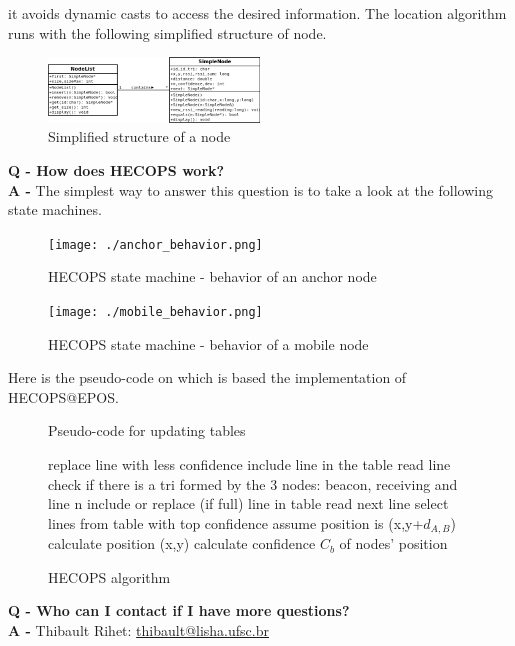 \documentclass[a4paper,10pt]{article}
\begin{document}
it avoids dynamic casts to access the desired information. The location algorithm runs with the following simplified structure of node.
\begin{figure}[H]
\centering
 \includegraphics[width=0.5\textwidth]{simpleNode.png}
\caption{Simplified structure of a node}
\end{figure}
\noindent
\textbf{Q - How does HECOPS work?} \\
\textbf{A - }The simplest way to answer this question is to take a look at the following state machines.
\begin{figure}[H]
\centering
 \texttt{[image: ./anchor\_behavior.png]}
\caption{HECOPS state machine - behavior of an anchor node}
\end{figure}
\begin{figure}[H]
\centering
 \texttt{[image: ./mobile\_behavior.png]}
\caption{HECOPS state machine - behavior of a mobile node}
\end{figure}
\noindent
Here is the pseudo-code on which is based the implementation of HECOPS@EPOS.
\begin{figure}[H]
\begin{algorithm}[H]
\caption{Pseudo-code for updating tables}
\begin{algorithmic}[H]
\STATE replace line with less confidence
\ELSE 
\STATE include line in the table
\ENDIF
{}
\STATE read line
\STATE check if there is a tri formed by the 3 nodes: beacon, receiving and line n
\STATE include or replace (if full) line in table
\ELSE
\STATE read next line
\ENDIF
\ENDFOR
\STATE select lines from table with top confidence
\STATE assume position is (x,y+$d_{A,B}$)
\ELSE
\STATE calculate position (x,y)
\ENDIF
\STATE calculate confidence $C_b$ of nodes' position
\end{algorithmic}
\end{algorithm}
\caption{HECOPS algorithm}
\end{figure}
\noindent
\textbf{Q - Who can I contact if I have more questions?} \\
\textbf{A - }Thibault Rihet: \href{mailto:thibault@lisha.ufsc.br}{thibault@lisha.ufsc.br}
\end{document}
